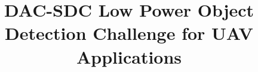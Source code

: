 \documentclass[10pt,journal,compsoc]{IEEEtran}
\begin{document}
%
\title{DAC-SDC Low Power Object Detection Challenge for UAV Applications}
%
%
%
%
\end{document}
